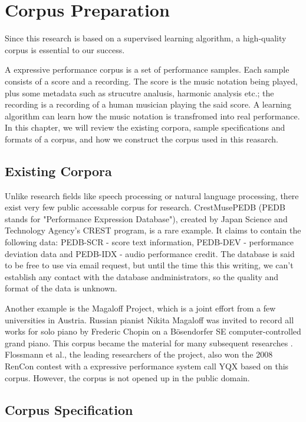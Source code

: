 \chapter{Corpus Preparation}
\label{chap:corpus}
Since this research is based on a supervised learning algorithm, a high-quality corpus is essential to our success. 

A expressive performance corpus is a set of performance samples. Each sample consists of a score and a recording. The score is the music notation being played, plus some metadata such as strucutre analusis, harmonic analysis etc.; the recording is a recording of a human musician playing the said score. A learning algorithm can learn how the music notation is transfromed into real performance. In this chapter, we will review the existing corpora, sample specifications and formats of a corpus, and how we construct the corpus used in this reasarch.

\section{Existing Corpora} 
Unlike research fields like speech processing or natural language processing, there exist very few public accessable corpus for research. CrestMusePEDB\cite{crestmuse} (PEDB stands for "Performance Expression Database"), created by Japan Science and Technology Agency's CREST program, is a rare example. It claims to contain the following data: PEDB-SCR - score text information, PEDB-DEV - performance deviation data and PEDB-IDX - audio performance credit. The database is said to be free to use via email request, but until the time this this writing, we can't establish any contact with the database andministrators, so the quality and format of the data is unknown.

Another example is the Magaloff Project\cite{magaloff}, which is a joint effort from a few universities in Austria.  Russian pianist Nikita Magaloff was invited to record all works for solo piano by Frederic Chopin on a Bösendorfer SE computer-controlled grand piano. This corpus became the material for many subsequent researches \cite{Goebl2009, Grachten2011, Flossmann2009, Grachten2012, Flossmann2013, Flossman2011, Flossmann2010a}. Flossmann et al., the leading researchers of the project, also won the 2008 RenCon contest with a expressive performance system call YQX\cite{yqx} based on this corpus. However, the corpus is not opened up in the public domain. 

\section{Corpus Specification}

